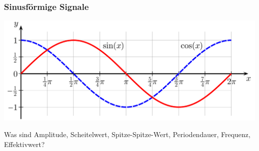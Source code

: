 \begin{frame}
    \frametitle{Sinusförmige Signale}

    \begin{center}
        \includegraphics[width=1\textwidth]{a11/Sine_cosine_one_period.png}
        \tiny \hyperlink{refs}{\cite{wc}}
    \end{center}

    Was sind Amplitude, Scheitelwert, Spitze-Spitze-Wert, Periodendauer,
    Frequenz, Effektivwert?

\end{frame}


